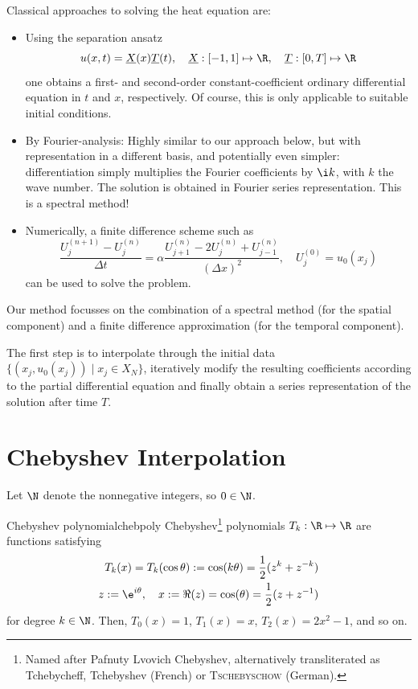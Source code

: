 \documentclass[12pt, a4paper]{article}
\newcommand{\chebyshev}{Chebyshev\xspace}
\begin{document}
  Classical approaches to solving the heat equation are:
  \begin{itemize}
    \item Using the separation ansatz
          $$u(x, t) = \underline{X}(x) \underline{T}(t), \quad \underline{X}: [-1, 1] \mapsto \R, \quad \underline{T}: [0, T] \mapsto \R$$
          one obtains a first- and second-order constant-coefficient ordinary differential equation in $t$ and $x$, respectively. Of course, this is only applicable to suitable initial conditions.

    \item By Fourier-analysis: Highly similar to our approach below, but with representation in a different basis, and potentially even simpler: differentiation simply multiplies the Fourier coefficients by $\i k$, with $k$ the wave number. The solution is obtained in Fourier series representation. This is a spectral method!

    \item Numerically, a finite difference scheme such as
          $$\frac{U_{j}^{(n+1)} - U_{j}^{(n)}}{\Delta t} = \alpha \frac{U_{j+1}^{(n)} - 2 U_{j}^{(n)} + U_{j-1}^{(n)}}{(\Delta x)^2}, \quad U_j^{(0)} = u_0(x_j)$$ can be used to solve the problem.
  \end{itemize}

  Our method focusses on the combination of a spectral method (for the spatial component) and a finite difference approximation (for the temporal component).

  The first step is to interpolate through the initial data $\{(x_j, u_0(x_j)) \;|\; x_j \in X_N\}$, iteratively modify the resulting coefficients according to the partial differential equation and finally obtain a series representation of the solution after time $T$.

  \pagebreak
  \section{Chebyshev Interpolation}
  Let $\N$ denote the nonnegative integers, so $0 \in \N$.

  \begin{definition}{Chebyshev polynomial}{chebpoly}
    \chebyshev\footnote{Named after Pafnuty Lvovich \chebyshev, alternatively transliterated as Tchebycheff, Tchebyshev (French) or \textsc{Tschebyschow} (German).} polynomials $T_k: \R \mapsto \R$ are functions satisfying
    \begin{align*}
      T_k(x) = T_k(\cos \theta) := \cos(k \theta) = \frac{1}{2} (z^k + z^{-k}) \\
      z := \e^{i \theta},\quad x := \Re(z) = \cos(\theta) = \frac{1}{2}(z + z^{-1})
    \end{align*}
    for degree $k \in \N$. Then, $T_0(x) = 1$, $T_1(x) = x$, $T_2(x) = 2x^2-1$, and so on.
  \end{definition}
\end{document}
